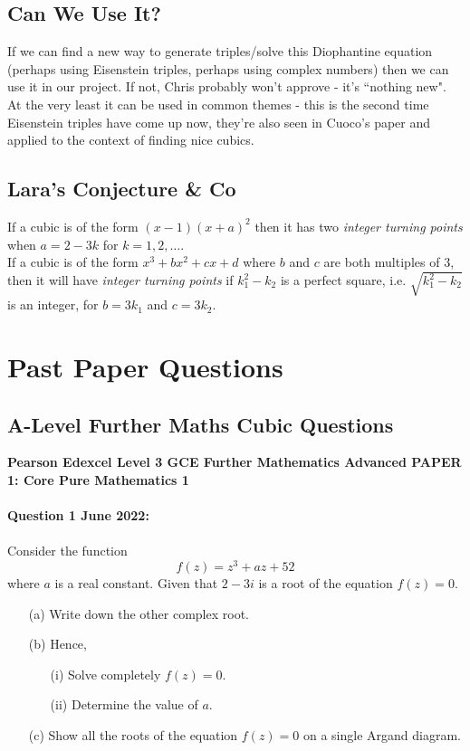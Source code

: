\documentclass[12pt]{article}
\begin{document}
\subsection{Can We Use It?}
If we can find a new way to generate triples/solve this Diophantine equation (perhaps using Eisenstein triples, perhaps using complex numbers) then we can use it in our project. If not, Chris probably won't approve - it's ``nothing new". At the very least it can be used in common themes - this is the second time Eisenstein triples have come up now, they're also seen in Cuoco's paper \autocite{cuoco2000} and applied to the context of finding nice cubics.

\subsection{Lara's Conjecture \& Co}
If a cubic is of the form $(x-1)(x+a)^2$ then it has two \textit{integer turning points} when $a = 2-3k$ for $k = 1, 2, \dots$. \\
If a cubic is of the form $x^3 + bx^2 + cx + d$ where $b$ and $c$ are both multiples of $3$, then it will have \textit{integer turning points} if $k_1^2 - k_2$ is a perfect square, i.e. $\sqrt{k_1^2 - k_2}$ is an integer, for $b = 3k_1$ and $c = 3k_2$.

\section{Past Paper Questions}

\subsection{A-Level Further Maths Cubic Questions}
\textbf{Pearson Edexcel Level 3 GCE Further Mathematics
Advanced PAPER 1: Core Pure Mathematics 1}\\\\
\textbf{Question 1 June 2022:}\\\\
Consider the function 
\[f(z) = z^3 + az + 52\]
where \( a \) is a real constant. Given that \( 2 - 3i \) is a root of the equation \( f(z) = 0 \).
\begin{enumerate}
    \item[(a)] Write down the other complex root.
    \item[(b)] Hence,
    \begin{enumerate}
        \item[(i)] Solve completely \( f(z) = 0 \).
        \item[(ii)] Determine the value of \( a \).
    \end{enumerate}
    \item[(c)] Show all the roots of the equation \( f(z) = 0 \) on a single Argand diagram.\\\\
\end{enumerate}
\end{document}
